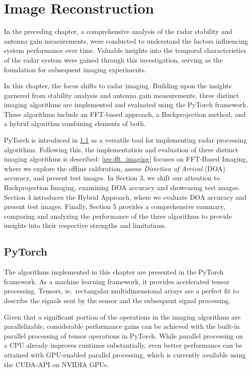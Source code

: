 \chapter{Image Reconstruction}
\label{ch:imaging}
In the preceding chapter, a comprehensive analysis of the radar stability and antenna gain measurements,
were conducted to understand the factors influencing system performance over time.
Valuable insights into the temporal characteristics of the radar system were gained through this investigation,
serving as the foundation for subsequent imaging experiments.

In this chapter, the focus shifts to radar imaging.
Building upon the insights garnered from stability analysis and antenna gain measurements,
three distinct imaging algorithms are implemented and evaluated using the PyTorch framework.
These algorithms include an FFT-based approach, a Backprojection method, and a hybrid algorithm combining elements of both.

PyTorch is introduced in \cref{app:pytorch} as a versatile tool for implementing radar processing algorithms.
Following this, the implementation and evaluation of three distinct imaging algorithms is described:
\cref{sec:fft_imaging} focuses on FFT-Based Imaging, where we explore the offline calibration,
assess \emph{Direction of Arrival} (DOA) accuracy,
and present test images. In Section 3, we shift our attention to Backprojection Imaging,
examining DOA accuracy and showcasing test images. Section 4 introduces the Hybrid Approach,
where we evaluate DOA accuracy and present test images.
Finally, Section 5 provides a comprehensive summary,
comparing and analyzing the performance of the three algorithms to provide insights into their respective strengths and limitations.

\section{PyTorch}
\label{app:pytorch}
The algorithms implemented in this chapter are presented in the PyTorch framework.
As a machine learning framework, it provides accelerated tensor processing.
Tensors, ie.\ rectangular multidimensional arrays are a perfect fit to
describe the signals sent by the sensor and the subsequent signal processing.

Given that a significant portion of the operations in the imaging algorithms are parallelizable,
considerable performance gains can be achieved with the built-in parallel processing of tensor operations in PyTorch.
While parallel processing on a CPU already improves runtimes substantially,
even better performance can be attained with GPU-enabled parallel processing,
which is currently available using the CUDA-API on NVIDIA GPUs.

